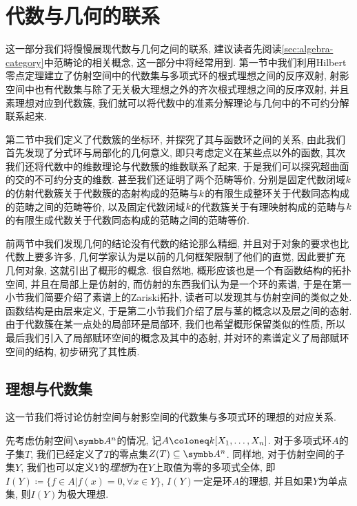 
\section{代数与几何的联系}\label{sec:algebraandgeometry}

这一部分我们将慢慢展现代数与几何之间的联系, 建议读者先阅读\ref{sec:algebra-category}中范畴论的相关概念, 这一部分中将经常用到. 第一节中我们利用Hilbert零点定理建立了仿射空间中的代数集与多项式环的根式理想之间的反序双射, 射影空间中也有代数集与除了无关极大理想之外的齐次根式理想之间的反序双射, 并且素理想对应到代数簇, 我们就可以将代数中的准素分解理论与几何中的不可约分解联系起来.

第二节中我们定义了代数簇的坐标环, 并探究了其与函数环之间的关系, 由此我们首先发现了分式环与局部化的几何意义, 即只考虑定义在某些点以外的函数, 其次我们还将代数中的维数理论与代数簇的维数联系了起来, 于是我们可以探究超曲面的交的不可约分支的维数. 甚至我们还证明了两个范畴等价, 分别是固定代数闭域$k$的仿射代数簇关于代数簇的态射构成的范畴与$k$的有限生成整环关于代数同态构成的范畴之间的范畴等价, 以及固定代数闭域$k$的代数簇关于有理映射构成的范畴与$k$的有限生成代数关于代数同态构成的范畴之间的范畴等价.

前两节中我们发现几何的结论没有代数的结论那么精细, 并且对于对象的要求也比代数上要多许多, 几何学家认为是以前的几何框架限制了他们的直觉, 因此要扩充几何对象, 这就引出了概形的概念. 很自然地, 概形应该也是一个有函数结构的拓扑空间, 并且在局部上是仿射的, 而仿射的东西我们认为是一个环的素谱, 于是在第一小节我们简要介绍了素谱上的Zariski拓扑, 读者可以发现其与仿射空间的类似之处. 函数结构是由层来定义, 于是第二小节我们介绍了层与茎的概念以及层之间的态射. 由于代数簇在某一点处的局部环是局部环, 我们也希望概形保留类似的性质, 所以最后我们引入了局部赋环空间的概念及其中的态射, 并对环的素谱定义了局部赋环空间的结构, 初步研究了其性质.


\subsection{理想与代数集}\label{sec:ag-ideal}

这一节我们将讨论仿射空间与射影空间的代数集与多项式环的理想的对应关系.

先考虑仿射空间$\AF^n$的情况, 记$A\coloneq \kk [X_1, \dotsc, X_n]$. 对于多项式环$A$的子集$T$, 我们已经定义了$T$的零点集$Z(T)\subseteq\AF^n$. 同样地, 对于仿射空间的子集$Y$, 我们也可以定义$Y$的\emph{理想}为在$Y$上取值为零的多项式全体, 即$I(Y)\coloneq \{f\in A\vert f(x)=0, \forall x\in Y\}$, $I(Y)$一定是环$A$的理想, 并且如果$Y$为单点集, 则$I(Y)$为极大理想.

